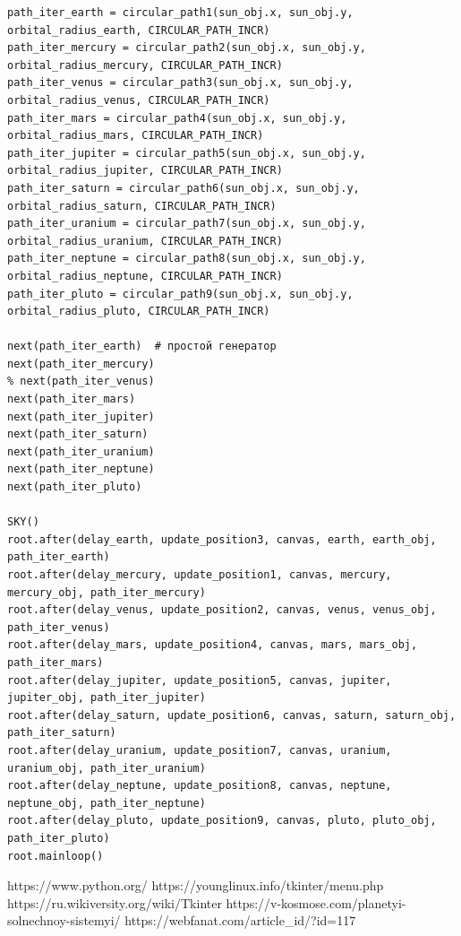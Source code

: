 \documentclass[11pt,a4paper]{report}
\begin{document}
\begin{verbatim}
path_iter_earth = circular_path1(sun_obj.x, sun_obj.y, orbital_radius_earth, CIRCULAR_PATH_INCR)
path_iter_mercury = circular_path2(sun_obj.x, sun_obj.y, orbital_radius_mercury, CIRCULAR_PATH_INCR)
path_iter_venus = circular_path3(sun_obj.x, sun_obj.y, orbital_radius_venus, CIRCULAR_PATH_INCR)
path_iter_mars = circular_path4(sun_obj.x, sun_obj.y, orbital_radius_mars, CIRCULAR_PATH_INCR)
path_iter_jupiter = circular_path5(sun_obj.x, sun_obj.y, orbital_radius_jupiter, CIRCULAR_PATH_INCR)
path_iter_saturn = circular_path6(sun_obj.x, sun_obj.y, orbital_radius_saturn, CIRCULAR_PATH_INCR)
path_iter_uranium = circular_path7(sun_obj.x, sun_obj.y, orbital_radius_uranium, CIRCULAR_PATH_INCR)
path_iter_neptune = circular_path8(sun_obj.x, sun_obj.y, orbital_radius_neptune, CIRCULAR_PATH_INCR)
path_iter_pluto = circular_path9(sun_obj.x, sun_obj.y, orbital_radius_pluto, CIRCULAR_PATH_INCR)

next(path_iter_earth)  # простой генератор
next(path_iter_mercury)
% next(path_iter_venus)
next(path_iter_mars)
next(path_iter_jupiter)
next(path_iter_saturn)
next(path_iter_uranium)
next(path_iter_neptune)
next(path_iter_pluto)

SKY()
root.after(delay_earth, update_position3, canvas, earth, earth_obj, path_iter_earth)
root.after(delay_mercury, update_position1, canvas, mercury, mercury_obj, path_iter_mercury)
root.after(delay_venus, update_position2, canvas, venus, venus_obj, path_iter_venus)
root.after(delay_mars, update_position4, canvas, mars, mars_obj, path_iter_mars)
root.after(delay_jupiter, update_position5, canvas, jupiter, jupiter_obj, path_iter_jupiter)
root.after(delay_saturn, update_position6, canvas, saturn, saturn_obj, path_iter_saturn)
root.after(delay_uranium, update_position7, canvas, uranium, uranium_obj, path_iter_uranium)
root.after(delay_neptune, update_position8, canvas, neptune, neptune_obj, path_iter_neptune)
root.after(delay_pluto, update_position9, canvas, pluto, pluto_obj, path_iter_pluto)
root.mainloop()

\end{verbatim}



\begin{thebibliography}{5}
https://www.python.org/
https://younglinux.info/tkinter/menu.php
https://ru.wikiversity.org/wiki/Tkinter
https://v-kosmose.com/planetyi-solnechnoy-sistemyi/
https://webfanat.com/article\_id/?id=117
\end{thebibliography}
\end{document}
